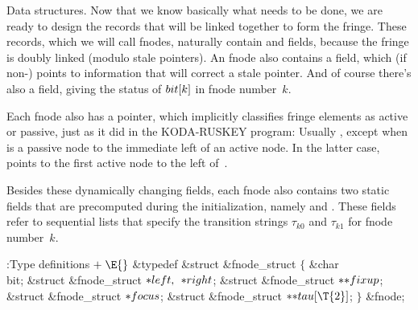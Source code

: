\fi

Data structures. Now that we know basically what
needs to be done,
we are ready to design the records that will be linked together
to form the fringe. These records, which we will call fnodes, naturally
contain  and  fields, because the fringe is doubly
linked (modulo stale pointers). An fnode also contains a  field,
which (if non-\PB{$\NULL$}) points to information that will correct a
stale  pointer. And of course there's also a  field,
giving the status of $\\{bit}[k]$ in fnode number~$k$.

Each fnode also has a  pointer, which implicitly classifies
fringe elements as active or passive, just as it did in the
{\mc KODA-RUSKEY} program: Usually , except when
 is a passive node to the immediate left of an active node.
In the latter case,  points to the first active node
to the left of~.

Besides these dynamically changing fields, each fnode also contains
two static fields that are precomputed during the initialization,
namely  and . These fields refer to
sequential
lists that specify the transition strings $\tau_{k0}$ and $\tau_{k1}$
for fnode number~$k$.

\Y\B\4:Type definitions\X${}\mathrel+\E{}$\6
\&{typedef} \&{struct} \&{fnode\_struct} ${}\{{}$\1\6
\&{char} \\{bit};\6
\&{struct} \&{fnode\_struct} ${}{*}\\{left},{}$ ${}{*}\\{right}{}$;\6
\&{struct} \&{fnode\_struct} ${}{*}{*}\\{fixup}{}$;\6
\&{struct} \&{fnode\_struct} ${}{*}\\{focus}{}$;\6
\&{struct} \&{fnode\_struct} ${}{*}{*}\\{tau}[\T{2}]{}$;\2\6
${}\}{}$ \&{fnode};\par
\fi

